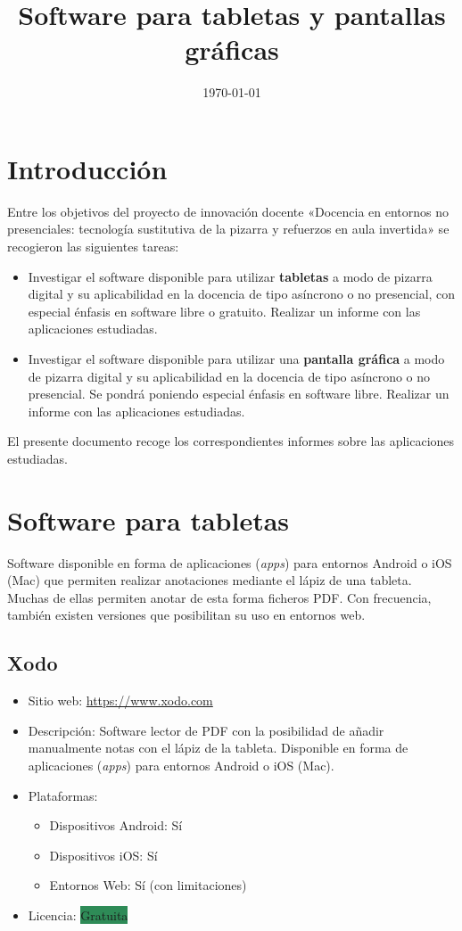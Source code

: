 \documentclass[11pt]{article}
\title{Software para tabletas y pantallas gráficas}
\date{\today}
\newcommand{\gratis}{\colorbox{SeaGreen}{Gratuita}}
\begin{document}
\maketitle

\section{Introducción}
Entre los objetivos del proyecto de innovación docente «Docencia en
entornos no presenciales: tecnología sustitutiva de la pizarra y
refuerzos en aula invertida» se recogieron las siguientes tareas:

\begin{itemize}
\item Investigar el software disponible para utilizar
  \textbf{tabletas} a modo de pizarra digital y su aplicabilidad en la
  docencia de tipo asíncrono o no presencial, con especial énfasis en
  software libre o gratuito. Realizar un informe con las aplicaciones
  estudiadas.

\item Investigar el software disponible para utilizar una \textbf{pantalla
  gráfica} a modo de pizarra digital y su aplicabilidad en la docencia
  de tipo asíncrono o no presencial. Se pondrá poniendo especial
  énfasis en software libre. Realizar un informe con las aplicaciones
  estudiadas.
\end{itemize}

El presente documento recoge los correspondientes informes sobre las aplicaciones estudiadas.

\section{Software para tabletas}

Software disponible en forma de aplicaciones (\textit{apps}) para
entornos Android o iOS (Mac) que permiten realizar anotaciones
mediante el lápiz de una tableta. Muchas de ellas permiten anotar de
esta forma ficheros PDF. Con frecuencia, también existen versiones que
posibilitan su uso en entornos web.

\subsection{Xodo}

\begin{itemize}
\item Sitio web: \url{https://www.xodo.com}
\item Descripción:
Software lector de PDF con la posibilidad de añadir manualmente notas
con el lápiz de la tableta. Disponible en forma de aplicaciones
(\textit{apps}) para entornos Android o iOS (Mac).
\item Plataformas:
  \begin{itemize}
  \item Dispositivos Android: Sí
  \item Dispositivos iOS: Sí
  \item Entornos Web: Sí (con limitaciones)
  \end{itemize}
\item Licencia: \gratis
\end{itemize}
\end{document}
